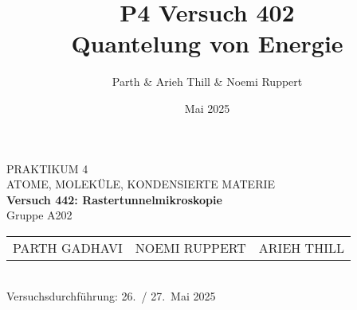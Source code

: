 \documentclass[ngerman]{scrartcl}
\title{P4 Versuch 402 \\[1ex] \large Quantelung von Energie}
\author{Parth \& Arieh Thill \& Noemi Ruppert}
\date{Mai 2025}
\begin{document}
\begin{titlepage}
  \centering
  \vspace*{2cm}
  
  {\Large PRAKTIKUM 4}\\[0.5cm]
  {\large ATOME, MOLEKÜLE, KONDENSIERTE MATERIE}\\[1cm]
  
  {\LARGE\bfseries Versuch 442: Rastertunnelmikroskopie}\\[1cm]
  
  Gruppe A202\\[1cm]
  
  \begin{tabular}{lll}
    PARTH GADHAVI   & NOEMI RUPPERT   & ARIEH THILL \\
  \end{tabular}\\[2cm]
  
  Versuchsdurchführung: 26.~/ 27.~Mai 2025
  
  \vfill
\end{titlepage}

\tableofcontents
\clearpage
\clearpage
\setcounter{page}{1}



\appendix
\printbibliography{}

\end{document}
